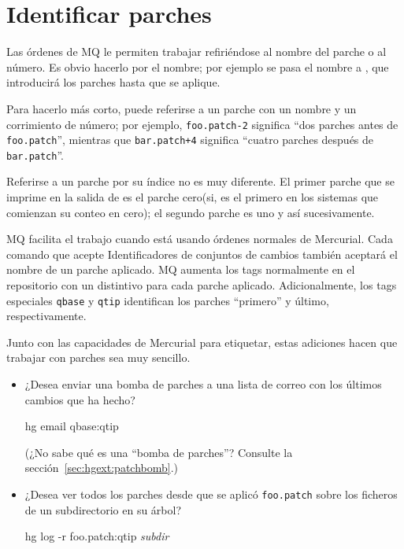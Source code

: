 \section{Identificar parches}

Las órdenes de MQ le permiten trabajar refiriéndose al nombre del
parche o al número.  Es obvio hacerlo por el nombre; por ejemplo se
pasa el nombre  a , que
introducirá los parches hasta que  se aplique.  

Para hacerlo más corto, puede referirse a un parche con un nombre y un
corrimiento de número; por ejemplo,  \texttt{foo.patch-2} significa
``dos parches antes de \texttt{foo.patch}'', mientras que
\texttt{bar.patch+4} significa ``cuatro parches después de \texttt{bar.patch}''.

Referirse a un parche por su índice no es muy diferente.  El primer
parche que se imprime en la salida de  es el
parche cero(si, es el primero en los sistemas que comienzan su conteo
en cero); el segundo parche es uno y así sucesivamente.

MQ facilita el trabajo cuando está usando órdenes normales de
Mercurial.  Cada comando que acepte Identificadores de conjuntos de
cambios también aceptará el nombre de un parche aplicado.  MQ aumenta
los tags normalmente en el repositorio con un distintivo para cada
parche aplicado.  Adicionalmente, los tags especiales \texttt{qbase} y \texttt{qtip} identifican los parches
``primero'' y último, respectivamente.

Junto con las capacidades de Mercurial para etiquetar, estas adiciones
hacen que trabajar con parches sea muy sencillo.
\begin{itemize}
\item ¿Desea enviar una bomba de parches a una lista de correo con los
  últimos cambios que ha hecho?
  \begin{codesample4}
    hg email qbase:qtip
  \end{codesample4}
  (¿No sabe qué es una ``bomba de parches''?  Consulte la
  sección~\ref{sec:hgext:patchbomb}.)
\item ¿Desea ver todos los parches desde que se aplicó
  \texttt{foo.patch} sobre los ficheros de un subdirectorio en su
  árbol?
  \begin{codesample4}
    hg log -r foo.patch:qtip \emph{subdir}
  \end{codesample4}
\end{itemize}

